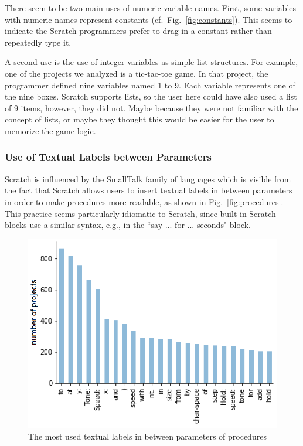 \documentclass[conference]{IEEEtran}
\begin{document}
There seem to be two main uses of numeric variable names. First, some variables with numeric names represent constants (cf.\ Fig.~\ref{fig:constants}). This seems to indicate the Scratch programmers prefer to drag in a constant rather than repeatedly type it.

A second use is the use of integer variables as simple list structures. For example, one of the projects we analyzed is a tic-tac-toe game. In that project, the programmer defined nine variables named 1 to 9. Each variable represents one of the nine boxes. Scratch supports lists, so the user here could have also used a list of 9 items, however, they did not. Maybe because they were not familiar with the concept of lists, or maybe they thought this would be easier for the user to memorize the game logic.  

\subsubsection{Use of Textual Labels between Parameters}
Scratch is influenced by the SmallTalk family of languages which is visible from the fact that Scratch allows users to insert textual labels in between parameters in order to make procedures more readable, as shown in Fig.~\ref{fig:procedures}.
This practice seems particularly idiomatic to Scratch, since built-in Scratch blocks use a similar syntax, e.g., in the ``say ... for ... seconds" block. 
\begin{figure}
	\begin{center}
		\includegraphics[width=\columnwidth]{fig/project/labels_in_procedures}
		\caption{The most used textual labels in between parameters of procedures}
		\label{fig:labels}
	\end{center}
\end{figure} 
\end{document}
